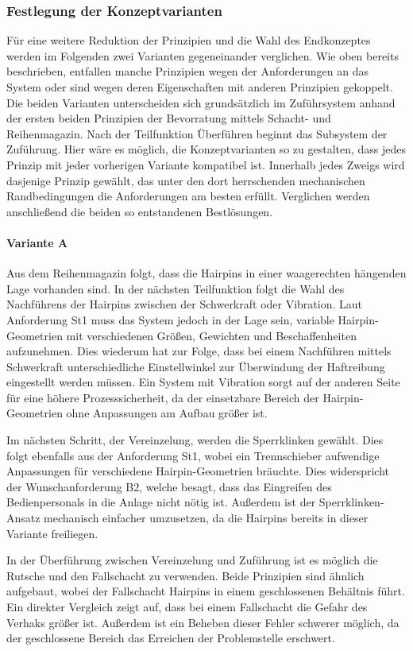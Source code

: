 \subsubsection{Festlegung der Konzeptvarianten}
Für eine weitere Reduktion der Prinzipien und die Wahl des Endkonzeptes werden im Folgenden zwei Varianten gegeneinander verglichen.
Wie oben bereits beschrieben, entfallen manche Prinzipien wegen der Anforderungen an das System oder sind wegen deren Eigenschaften
mit anderen Prinzipien gekoppelt. Die beiden Varianten unterscheiden sich grundsätzlich im Zuführsystem anhand der ersten beiden
Prinzipien der Bevorratung mittels Schacht- und Reihenmagazin. Nach der Teilfunktion Überführen beginnt das Subsystem der Zuführung.
Hier wäre es möglich, die Konzeptvarianten so zu gestalten, dass jedes Prinzip mit jeder vorherigen Variante kompatibel ist.
Innerhalb jedes Zweigs wird dasjenige Prinzip gewählt, das unter den dort herrschenden mechanischen Randbedingungen die Anforderungen
am besten erfüllt. Verglichen werden anschließend die beiden so entstandenen Bestlösungen.

\paragraph{Variante A} Aus dem Reihenmagazin folgt, dass die Hairpins in einer waagerechten hängenden Lage vorhanden sind. In der
nächsten Teilfunktion folgt die Wahl des Nachführens der Hairpins zwischen der Schwerkraft oder Vibration. Laut Anforderung St1
muss das System jedoch in der Lage sein, variable Hairpin-Geometrien mit verschiedenen Größen, Gewichten und Beschaffenheiten
aufzunehmen. Dies wiederum hat zur Folge, dass bei einem Nachführen mittels Schwerkraft unterschiedliche Einstellwinkel zur Überwindung
der Haftreibung eingestellt werden müssen. Ein System mit Vibration sorgt auf der anderen Seite für eine höhere Prozesssicherheit,
da der einsetzbare Bereich der Hairpin-Geometrien ohne Anpassungen am Aufbau größer ist.

Im nächsten Schritt, der Vereinzelung, werden die Sperrklinken gewählt. Dies folgt ebenfalls aus der Anforderung St1, wobei
ein Trennschieber aufwendige Anpassungen für verschiedene Hairpin-Geometrien bräuchte. Dies widerspricht der Wunschanforderung B2,
welche besagt, dass das Eingreifen des Bedienpersonals in die Anlage nicht nötig ist. Außerdem ist der Sperrklinken-Ansatz
mechanisch einfacher umzusetzen, da die Hairpins bereits in dieser Variante freiliegen.

In der Überführung zwischen Vereinzelung und Zuführung ist es möglich die Rutsche und den Fallschacht zu verwenden. Beide Prinzipien
sind ähnlich aufgebaut, wobei der Fallschacht Hairpins in einem geschlossenen Behältnis führt. Ein direkter Vergleich zeigt auf,
dass bei einem Fallschacht die Gefahr des Verhaks größer ist. Außerdem ist ein Beheben dieser Fehler schwerer möglich, da
der geschlossene Bereich das Erreichen der Problemstelle erschwert.

